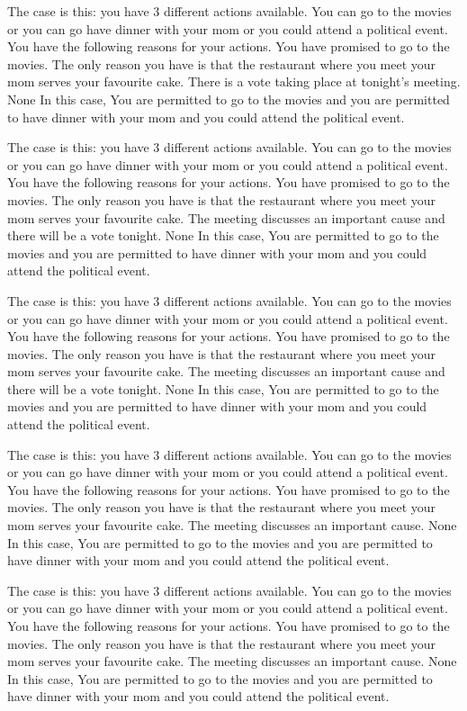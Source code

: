 The case is this: you have  3  different actions available.  You can go to the movies or you can go have dinner with your mom or you could attend a political event.
You have the following reasons for your actions.  You have promised to go to the movies. The only reason you have is that the restaurant where you meet your mom serves your favourite cake. There is a vote taking place at tonight's meeting. 
None
In this case,  You are permitted to go to the movies and you are permitted to have dinner with your mom and you could attend the political event.
 
The case is this: you have  3  different actions available.  You can go to the movies or you can go have dinner with your mom or you could attend a political event.
You have the following reasons for your actions.  You have promised to go to the movies. The only reason you have is that the restaurant where you meet your mom serves your favourite cake. The meeting discusses an important cause and there will be a vote tonight. 
None
In this case,  You are permitted to go to the movies and you are permitted to have dinner with your mom and you could attend the political event.
 
The case is this: you have  3  different actions available.  You can go to the movies or you can go have dinner with your mom or you could attend a political event.
You have the following reasons for your actions.  You have promised to go to the movies. The only reason you have is that the restaurant where you meet your mom serves your favourite cake. The meeting discusses an important cause and there will be a vote tonight. 
None
In this case,  You are permitted to go to the movies and you are permitted to have dinner with your mom and you could attend the political event.
 
The case is this: you have  3  different actions available.  You can go to the movies or you can go have dinner with your mom or you could attend a political event.
You have the following reasons for your actions.  You have promised to go to the movies. The only reason you have is that the restaurant where you meet your mom serves your favourite cake. The meeting discusses an important cause. 
None
In this case,  You are permitted to go to the movies and you are permitted to have dinner with your mom and you could attend the political event.
 
The case is this: you have  3  different actions available.  You can go to the movies or you can go have dinner with your mom or you could attend a political event.
You have the following reasons for your actions.  You have promised to go to the movies. The only reason you have is that the restaurant where you meet your mom serves your favourite cake. The meeting discusses an important cause. 
None
In this case,  You are permitted to go to the movies and you are permitted to have dinner with your mom and you could attend the political event.
 
